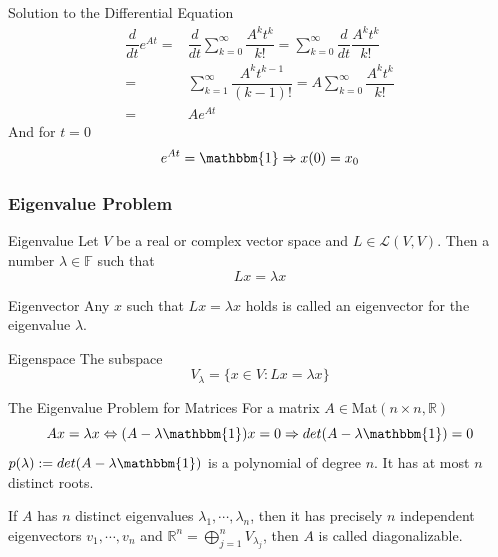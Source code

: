 \documentclass{beamer}
\begin{document}
\begin{frame}
\begin{block}{Solution to the Differential Equation}
\begin{align*}
\dfrac{d}{dt}e^{At}=&\dfrac{d}{dt}\sum\limits_{k=0}^{\infty}\dfrac{A^kt^k}{k!}=\sum\limits_{k=0}^{\infty}\dfrac{d}{dt}\dfrac{A^kt^k}{k!}\\
=&\sum\limits_{k=1}^{\infty}\dfrac{A^kt^{k-1}}{(k-1)!}=A\sum\limits_{k=0}^{\infty}\dfrac{A^kt^k}{k!}\\
=&Ae^{At}
\end{align*}
And for $t=0$
$$e^{At}=\mathbbm{1}\Rightarrow x(0)=x_0$$
\end{block}
\end{frame}

\begin{frame}
\frametitle{Eigenvalue Problem}

\begin{block}{Eigenvalue }
Let $V$ be a real or complex vector space and $L\in\mathcal{L}(V,V)$.  Then a number $\lambda\in\mathbb{F}$ such that
$$Lx=\lambda x$$
\end{block}
\begin{block}{Eigenvector}
Any $x$ such that $Lx=\lambda x$ holds is called an eigenvector for the eigenvalue $\lambda$.
\end{block}
\begin{block}{Eigenspace}
The subspace
$$V_{\lambda}=\lbrace x\in V:Lx=\lambda x\rbrace$$
\end{block}
\end{frame}

\begin{frame}
\begin{block}{The Eigenvalue Problem for Matrices}
For a matrix $A\in $Mat$(n\times n,\mathbb{R})$
$$Ax=\lambda x\Leftrightarrow (A-\lambda \mathbbm{1})x=0\Rightarrow det(A-\lambda\mathbbm{1})=0$$
$p(\lambda):=det(A-\lambda\mathbbm{1})$ is a polynomial of degree $n$. It has at most $n$ distinct roots.

\begin{block}{}
If $A$ has $n$ distinct eigenvalues $\lambda_1,\cdots,\lambda_n$, then it has precisely $n$ independent eigenvectors $v_1,\cdots,v_n$ and $\mathbb{R}^n=\mathop{\bigoplus}\limits_{j=1}^n V_{\lambda_j}$, then $A$ is called diagonalizable.
\end{block}
\end{block}
\end{frame}
\end{document}
